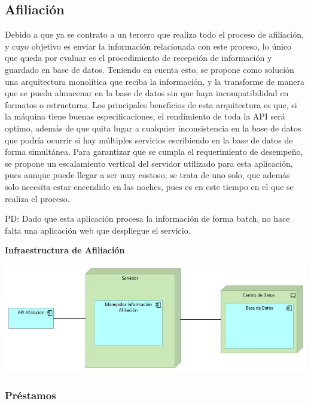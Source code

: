 \documentclass[a4paper]{article}
\begin{document}
\subsection{Afiliación}
Debido a que ya se contrato a un tercero que realiza todo el proceso de afiliación, y cuyo objetivo es enviar la información relacionada con este proceso, lo único que queda por evaluar es el procedimiento de recepción de información y guardado en base de datos. Teniendo en cuenta esto, se propone como solución una arquitectura monolítica que reciba la información, y la transforme de manera que se pueda almacenar en la base de datos sin que haya incompatibilidad en formatos o estructuras. Los principales beneficios de esta arquitectura es que, si la máquina tiene buenas especificaciones, el rendimiento de toda la API será optimo, además de que quita lugar a cualquier inconsistencia en la base de datos que podría ocurrir si hay múltiples servicios escribiendo en la base de datos de forma simultánea. Para garantizar que se cumpla el requerimiento de desempeño, se propone un escalamiento vertical del servidor utilizado para esta aplicación, pues aunque puede llegar a ser muy costoso, se trata de uno solo, que además solo necesita estar encendido en las noches, pues es en este tiempo en el que se realiza el proceso.

PD: Dado que esta aplicación procesa la información de forma batch, no hace falta una aplicación web que despliegue el servicio.
\begin{center}
    \textbf{Infraestructura de Afiliación}

    \includegraphics[scale=0.5]{afiliacion.jpeg}
\end{center}

\subsubsection{Préstamos}
\end{document}
